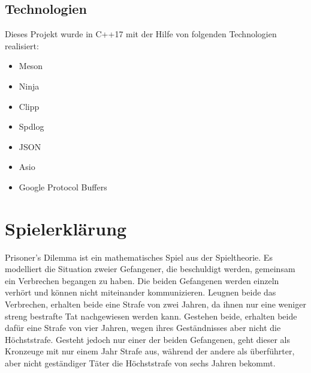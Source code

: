 \documentclass[12pt, letterpaper]{article}
\begin{document}
\subsection{Technologien}
Dieses Projekt wurde in C++17 mit der Hilfe von folgenden Technologien realisiert:
\begin{itemize}
	\item Meson
	\item Ninja
	\item Clipp
	\item Spdlog
	\item JSON
	\item Asio
	\item Google Protocol Buffers
\end{itemize}

\section{Spielerklärung}
Prisoner's Dilemma ist ein mathematisches Spiel aus der Spieltheorie. Es modelliert die Situation zweier Gefangener, die beschuldigt werden, gemeinsam ein Verbrechen begangen zu haben. Die beiden Gefangenen werden einzeln verhört und können nicht miteinander kommunizieren. Leugnen beide das Verbrechen, erhalten beide eine Strafe von zwei Jahren, da ihnen nur eine weniger streng bestrafte Tat nachgewiesen werden kann. Gestehen beide, erhalten beide dafür eine Strafe von vier Jahren, wegen ihres Geständnisses aber nicht die Höchststrafe. Gesteht jedoch nur einer der beiden Gefangenen, geht dieser als Kronzeuge mit nur einem Jahr Strafe aus, während der andere als überführter, aber nicht geständiger Täter die Höchststrafe von sechs Jahren bekommt.
\end{document}
